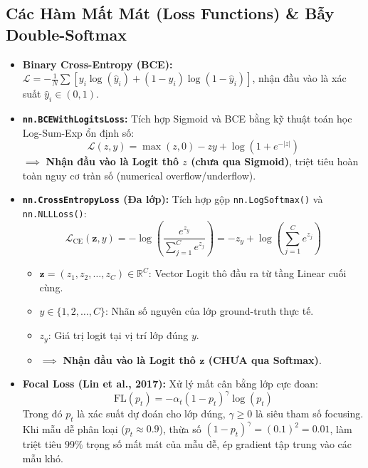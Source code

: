 \documentclass[10pt,a4paper]{article}
\begin{document}
\subsection{Các Hàm Mất Mát (Loss Functions) \& Bẫy Double-Softmax}
\begin{itemize}[leftmargin=*]
    \item \textbf{Binary Cross-Entropy (BCE):} $\mathcal{L} = -\frac{1}{N}\sum [y_i \log(\hat{y}_i) + (1-y_i)\log(1-\hat{y}_i)]$, nhận đầu vào là xác suất $\hat{y}_i \in (0, 1)$.
    \item \textbf{\texttt{nn.BCEWithLogitsLoss}:} Tích hợp Sigmoid và BCE bằng kỹ thuật toán học Log-Sum-Exp ổn định số:
    \begin{equation}
        \mathcal{L}(z, y) = \max(z, 0) - z y + \log(1 + e^{-|z|})
    \end{equation}
    $\implies$ \textbf{Nhận đầu vào là Logit thô $z$ (chưa qua Sigmoid)}, triệt tiêu hoàn toàn nguy cơ tràn số (numerical overflow/underflow).
    \item \textbf{\texttt{nn.CrossEntropyLoss} (Đa lớp):} Tích hợp gộp \texttt{nn.LogSoftmax()} và \texttt{nn.NLLLoss()}:
    \begin{equation}
        \mathcal{L}_{\text{CE}}(\mathbf{z}, y) = -\log\left( \frac{e^{z_y}}{\sum_{j=1}^C e^{z_j}} \right) = -z_y + \log\left( \sum_{j=1}^C e^{z_j} \right)
    \end{equation}
    \begin{itemize}[leftmargin=*]
        \item $\mathbf{z} = (z_1, z_2, \dots, z_C) \in \mathbb{R}^C$: Vector Logit thô đầu ra từ tầng Linear cuối cùng.
        \item $y \in \{1, 2, \dots, C\}$: Nhãn số nguyên của lớp ground-truth thực tế.
        \item $z_y$: Giá trị logit tại vị trí lớp đúng $y$.
        \item $\implies$ \textbf{Nhận đầu vào là Logit thô $\mathbf{z}$ (CHƯA qua Softmax)}.
    \end{itemize}
    \item \textbf{Focal Loss (Lin et al., 2017):} Xử lý mất cân bằng lớp cực đoan:
    \begin{equation}
        \text{FL}(p_t) = -\alpha_t (1 - p_t)^\gamma \log(p_t)
    \end{equation}
    Trong đó $p_t$ là xác suất dự đoán cho lớp đúng, $\gamma \ge 0$ là siêu tham số focusing. Khi mẫu dễ phân loại ($p_t \approx 0.9$), thừa số $(1 - p_t)^\gamma = (0.1)^2 = 0.01$, làm triệt tiêu $99\%$ trọng số mất mát của mẫu dễ, ép gradient tập trung vào các mẫu khó.
\end{itemize}
\end{document}
